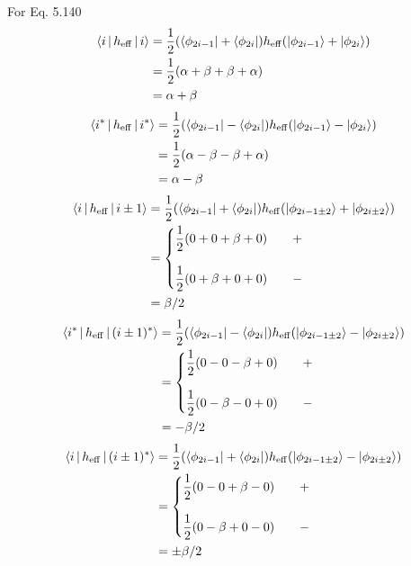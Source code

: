 \documentclass[a4paper]{article}
\DeclareMathOperator{\eff}{\mathrm{eff}}
\numberwithin{equation}{subsection}
\begin{document}
For Eq. 5.140
\begin{align}
\Braket{i | h_{\eff} | i} &= \dfrac{1}{2}\qty(\bra{\phi_{2i-1}} + \bra{\phi_{2i}}) h_{\eff} \qty(\ket{\phi_{2i-1}} + \ket{\phi_{2i}}) \notag\\
&= \dfrac{1}{2} (\alpha + \beta + \beta + \alpha) \notag\\
&= \alpha + \beta
\end{align}
\begin{align}
\Braket{i^* | h_{\eff} | i^*} &= \dfrac{1}{2}\qty(\bra{\phi_{2i-1}} - \bra{\phi_{2i}}) h_{\eff} \qty(\ket{\phi_{2i-1}} - \ket{\phi_{2i}}) \notag\\
&= \dfrac{1}{2} (\alpha - \beta - \beta + \alpha) \notag\\
&= \alpha - \beta
\end{align}
\begin{align}
\Braket{i | h_{\eff} | i\pm 1} &= \dfrac{1}{2}\qty(\bra{\phi_{2i-1}} + \bra{\phi_{2i}}) h_{\eff} \qty(\ket{\phi_{2i-1\pm 2}} + \ket{\phi_{2i\pm 2}}) \notag\\
&= \left\{ 
\mqty{\dfrac{1}{2} (0 + 0 + \beta + 0) \qquad +  \\ ~\\
	  \dfrac{1}{2} (0 + \beta + 0 + 0) \qquad -
}\right. \notag\\
&= \beta/2
\end{align}
\begin{align}
\Braket{i^* | h_{\eff} | (i\pm 1)^*} &= \dfrac{1}{2} \qty(\bra{\phi_{2i-1}} - \bra{\phi_{2i}}) h_{\eff} \qty(\ket{\phi_{2i-1\pm 2}} - \ket{\phi_{2i\pm 2}}) \notag\\
&= \left\{ 
\mqty{\dfrac{1}{2} (0 - 0 - \beta + 0) \qquad +  \\ ~\\
	\dfrac{1}{2} (0 - \beta - 0 + 0) \qquad -
}\right. \notag\\
&= -\beta/2
\end{align}
\begin{align}
\Braket{i | h_{\eff} | (i\pm 1)^*} &= \dfrac{1}{2}\qty(\bra{\phi_{2i-1}} + \bra{\phi_{2i}}) h_{\eff} \qty(\ket{\phi_{2i-1\pm 2}} - \ket{\phi_{2i\pm 2}}) \notag\\
&= \left\{ 
\mqty{\dfrac{1}{2} (0 - 0 + \beta - 0) \qquad +  \\ ~\\
	\dfrac{1}{2} (0 - \beta + 0 - 0) \qquad -
}\right. \notag\\
&= \pm\beta/2
\end{align}
\end{document}
